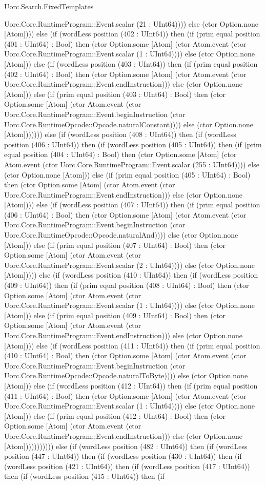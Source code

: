 \begin{lexlean}{Uorc.Search.FixedTemplates}
\begin{semanticmodule}
{Uorc.Core.RuntimeProgram::Event.scalar (21 : UInt64)))) else (ctor Option.none [Atom]))) else (if (wordLess position (402 : UInt64)) then (if (prim equal position (401 : UInt64) : Bool) then (ctor Option.some [Atom] (ctor Atom.event (ctor Uorc.Core.RuntimeProgram::Event.scalar (1 : UInt64)))) else (ctor Option.none [Atom])) else (if (wordLess position (403 : UInt64)) then (if (prim equal position (402 : UInt64) : Bool) then (ctor Option.some [Atom] (ctor Atom.event (ctor Uorc.Core.RuntimeProgram::Event.endInstruction))) else (ctor Option.none [Atom])) else (if (prim equal position (403 : UInt64) : Bool) then (ctor Option.some [Atom] (ctor Atom.event (ctor Uorc.Core.RuntimeProgram::Event.beginInstruction (ctor Uorc.Core.RuntimeOpcode::Opcode.naturalConstant)))) else (ctor Option.none [Atom])))))) else (if (wordLess position (408 : UInt64)) then (if (wordLess position (406 : UInt64)) then (if (wordLess position (405 : UInt64)) then (if (prim equal position (404 : UInt64) : Bool) then (ctor Option.some [Atom] (ctor Atom.event (ctor Uorc.Core.RuntimeProgram::Event.scalar (255 : UInt64)))) else (ctor Option.none [Atom])) else (if (prim equal position (405 : UInt64) : Bool) then (ctor Option.some [Atom] (ctor Atom.event (ctor Uorc.Core.RuntimeProgram::Event.endInstruction))) else (ctor Option.none [Atom]))) else (if (wordLess position (407 : UInt64)) then (if (prim equal position (406 : UInt64) : Bool) then (ctor Option.some [Atom] (ctor Atom.event (ctor Uorc.Core.RuntimeProgram::Event.beginInstruction (ctor Uorc.Core.RuntimeOpcode::Opcode.naturalAnd)))) else (ctor Option.none [Atom])) else (if (prim equal position (407 : UInt64) : Bool) then (ctor Option.some [Atom] (ctor Atom.event (ctor Uorc.Core.RuntimeProgram::Event.scalar (2 : UInt64)))) else (ctor Option.none [Atom])))) else (if (wordLess position (410 : UInt64)) then (if (wordLess position (409 : UInt64)) then (if (prim equal position (408 : UInt64) : Bool) then (ctor Option.some [Atom] (ctor Atom.event (ctor Uorc.Core.RuntimeProgram::Event.scalar (1 : UInt64)))) else (ctor Option.none [Atom])) else (if (prim equal position (409 : UInt64) : Bool) then (ctor Option.some [Atom] (ctor Atom.event (ctor Uorc.Core.RuntimeProgram::Event.endInstruction))) else (ctor Option.none [Atom]))) else (if (wordLess position (411 : UInt64)) then (if (prim equal position (410 : UInt64) : Bool) then (ctor Option.some [Atom] (ctor Atom.event (ctor Uorc.Core.RuntimeProgram::Event.beginInstruction (ctor Uorc.Core.RuntimeOpcode::Opcode.naturalToByte)))) else (ctor Option.none [Atom])) else (if (wordLess position (412 : UInt64)) then (if (prim equal position (411 : UInt64) : Bool) then (ctor Option.some [Atom] (ctor Atom.event (ctor Uorc.Core.RuntimeProgram::Event.scalar (1 : UInt64)))) else (ctor Option.none [Atom])) else (if (prim equal position (412 : UInt64) : Bool) then (ctor Option.some [Atom] (ctor Atom.event (ctor Uorc.Core.RuntimeProgram::Event.endInstruction))) else (ctor Option.none [Atom])))))))))) else (if (wordLess position (482 : UInt64)) then (if (wordLess position (447 : UInt64)) then (if (wordLess position (430 : UInt64)) then (if (wordLess position (421 : UInt64)) then (if (wordLess position (417 : UInt64)) then (if (wordLess position (415 : UInt64)) then (if }
\end{semanticmodule}
\end{lexlean}
